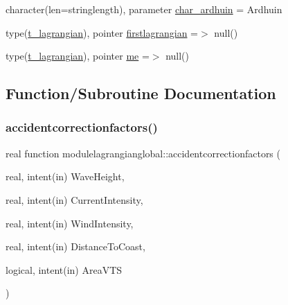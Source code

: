 \begin{DoxyCompactItemize}
\item 
character(len=stringlength), parameter \mbox{\hyperlink{namespacemodulelagrangianglobal_ac2beb6712fa14d25c55ed13cc11076df}{char\+\_\+ardhuin}} = \textquotesingle{}Ardhuin\textquotesingle{}
\item 
type(\mbox{\hyperlink{structmodulelagrangianglobal_1_1t__lagrangian}{t\+\_\+lagrangian}}), pointer \mbox{\hyperlink{namespacemodulelagrangianglobal_a23355c0e0c240a93d9b1e4dd5a894231}{firstlagrangian}} =$>$ null()
\item 
type(\mbox{\hyperlink{structmodulelagrangianglobal_1_1t__lagrangian}{t\+\_\+lagrangian}}), pointer \mbox{\hyperlink{namespacemodulelagrangianglobal_aa093dc1d2958bc73e2d1858e5a800b1a}{me}} =$>$ null()
\end{DoxyCompactItemize}


\subsection{Function/\+Subroutine Documentation}
\mbox{\label{namespacemodulelagrangianglobal_afb914f24bcc861691825610d67c3f53d}} 
\subsubsection{\texorpdfstring{accidentcorrectionfactors()}{accidentcorrectionfactors()}}
{\footnotesize\ttfamily real function modulelagrangianglobal\+::accidentcorrectionfactors (\begin{DoxyParamCaption}\item[{real, intent(in)}]{Wave\+Height,  }\item[{real, intent(in)}]{Current\+Intensity,  }\item[{real, intent(in)}]{Wind\+Intensity,  }\item[{real, intent(in)}]{Distance\+To\+Coast,  }\item[{logical, intent(in)}]{Area\+V\+TS }\end{DoxyParamCaption})\hspace{0.3cm}{\ttfamily [private]}}

